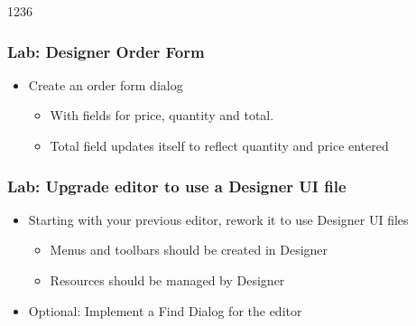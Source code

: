 \begin{slide}[fragile]{1236}
\frametitle{Lab: Designer Order Form}
\begin{itemize}
\item Create an order form dialog
  \begin{itemize}
  \item With fields for price, quantity and total.
  \item Total field updates itself to reflect quantity and price entered
  \end{itemize}
\end{itemize} 


\end{slide}

\begin{slide}\frametitle{Lab: Upgrade editor to use a Designer UI file}
\begin{itemize}
\item Starting with your previous editor, rework it to use Designer UI files
  \begin{itemize}
  \item Menus and toolbars should be created in Designer
  \item Resources should be managed by Designer
  \end{itemize}
\item Optional: Implement a Find Dialog for the editor
\end{itemize} 
\end{slide}

